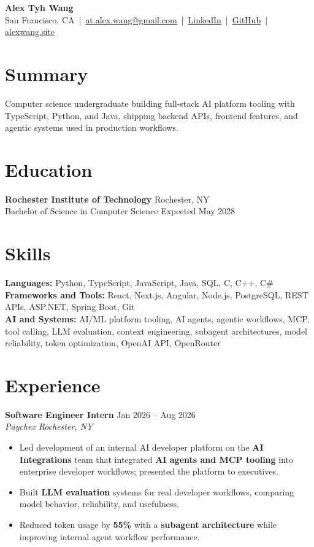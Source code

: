 \documentclass[10pt,letterpaper]{article}
\newif\ifresumeFirstRole
\newcommand{\resumeRole}[4]{%
  \ifresumeFirstRole
    \global\resumeFirstRolefalse
  \else
    \vspace{0pt plus 1fill}%
  \fi
  \textbf{#1} \hfill #2\\
  \textit{#3} \hfill \textit{#4}
}
\begin{document}
\begin{center}
{\Large \textbf{Alex Tyh Wang}}\\
San Francisco, CA \,|\, \href{mailto:at.alex.wang@gmail.com}{at.alex.wang@gmail.com} \,|\, \href{https://www.linkedin.com/in/alex-tyh-wang/}{LinkedIn} \,|\, \href{https://github.com/alextyhwang}{GitHub} \,|\, \href{https://alexwang.site}{alexwang.site}
\end{center}

\section*{Summary}
Computer science undergraduate building full-stack AI platform tooling with TypeScript, Python, and Java, shipping backend APIs, frontend features, and agentic systems used in production workflows.

\section*{Education}
\textbf{Rochester Institute of Technology} \hfill Rochester, NY\\
Bachelor of Science in Computer Science \hfill Expected May 2028

\section*{Skills}
\textbf{Languages:} Python, TypeScript, JavaScript, Java, SQL, C, C++, C\#\\
\textbf{Frameworks and Tools:} React, Next.js, Angular, Node.js, PostgreSQL, REST APIs, ASP.NET, Spring Boot, Git\\
\textbf{AI and Systems:} AI/ML platform tooling, AI agents, agentic workflows, MCP, tool calling, LLM evaluation, context engineering, subagent architectures, model reliability, token optimization, OpenAI API, OpenRouter

\section*{Experience}
\resumeRole{Software Engineer Intern}{Jan 2026 -- Aug 2026}{Paychex}{Rochester, NY}
\begin{itemize}
  \item Led development of an internal AI developer platform on the \textbf{AI Integrations} team that integrated \textbf{AI agents and MCP tooling} into enterprise developer workflows; presented the platform to executives.
  \item Built \textbf{LLM evaluation} systems for real developer workflows, comparing model behavior, reliability, and usefulness.
  \item Reduced token usage by \textbf{55\%} with a \textbf{subagent architecture} while improving internal agent workflow performance.
\end{itemize}
\end{document}
